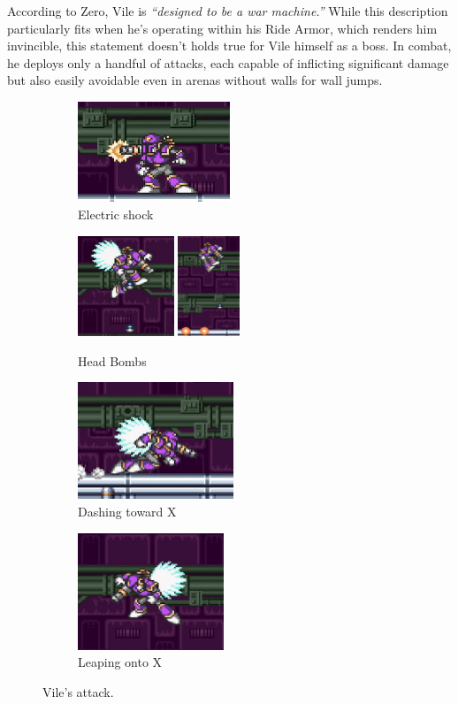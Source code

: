 According to Zero, Vile is \emph{``designed to be a war machine.''} While this description particularly fits when he's operating within his Ride Armor, which renders him invincible, this statement doesn't holds true for Vile himself as a boss. In combat, he deploys only a handful of attacks, each capable of inflicting significant damage but also easily avoidable even in arenas without walls for wall jumps. 
\begin{figure}[htp]
	\centering
	\begin{subfigure}[t]{0.4\linewidth}
		\centering
		\includegraphics[height=3cm]{figures/X1/Sigma_stages/Vile_cannon_1.jpg}
		\caption{Electric shock}
	\end{subfigure}
	\begin{subfigure}[t]{0.5\linewidth}
		\centering
		\includegraphics[height=3cm]{figures/X1/Sigma_stages/Vile_bomb_1.jpg}
		\includegraphics[height=3cm]{figures/X1/Sigma_stages/Vile_bomb_2.jpg}
		\caption{Head Bombs}
	\end{subfigure}
	\begin{subfigure}[t]{0.4\linewidth}
		\centering
		\includegraphics[height=3.5cm]{figures/X1/Sigma_stages/Vile_dash.jpg}
		\caption{Dashing toward X}
	\end{subfigure}
	\begin{subfigure}[t]{0.4\linewidth}
		\centering
		\includegraphics[height=3.5cm]{figures/X1/Sigma_stages/Vile_leap.jpg}
		\caption{Leaping onto X}
	\end{subfigure}
	\caption{Vile's attack.}
\end{figure} 

